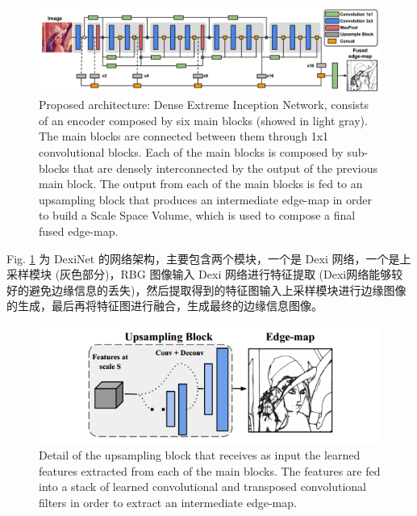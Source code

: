 \documentclass[a4paper, 10pt]{article}
\begin{document}
			\begin{figure}[htbp]
				\centering 
				\includegraphics[width=\columnwidth]{picture/Edge Detection/DeixNed Architecture}
				\captionsetup{font=scriptsize}
				\caption{
					\label{fig: DeixNed Architecture} 
					 Proposed architecture: Dense Extreme Inception Network, consists of an encoder composed by six main blocks (showed in light gray). The main blocks are connected between them through 1x1 convolutional blocks. Each of the main blocks is composed by sub-blocks that are densely interconnected by the output of the previous main block. The output from each of the main blocks is fed to an upsampling block that produces an intermediate edge-map in order to build a Scale Space Volume, which is used to compose a final fused edge-map.
				}
			\end{figure}
		
			Fig. \ref{fig: DeixNed Architecture} 为 DexiNet 的网络架构，主要包含两个模块，一个是 Dexi 网络，一个是上采样模块 (灰色部分)，RBG 图像输入 Dexi 网络进行特征提取 (Dexi网络能够较好的避免边缘信息的丢失)，然后提取得到的特征图输入上采样模块进行边缘图像的生成，最后再将特征图进行融合，生成最终的边缘信息图像。
			
			\begin{figure}[htbp]
				\centering 
				\includegraphics[width=0.7\columnwidth]{picture/Edge Detection/DeiXNed Upsampling Block}
				\captionsetup{font=scriptsize}
				\caption{
					\label{fig: DeixNed Architecture Block} 
					 Detail of the upsampling block that receives as input the learned features extracted from each of the main blocks. The features are fed into a stack of learned convolutional and transposed convolutional filters in order to extract an intermediate edge-map.
				}
			\end{figure}
			
\end{document}
